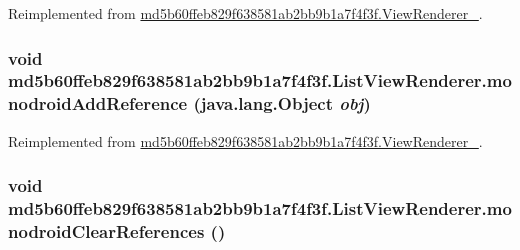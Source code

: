 Reimplemented from \hyperlink{classmd5b60ffeb829f638581ab2bb9b1a7f4f3f_1_1_view_renderer__2_a0898cf56fa9a49b653470eaf1608e77}{md5b60ffeb829f638581ab2bb9b1a7f4f3f.ViewRenderer\_}.\hypertarget{classmd5b60ffeb829f638581ab2bb9b1a7f4f3f_1_1_list_view_renderer_86959f77d1bb744ab196062ffa0c4a1a}{
\subsubsection[{monodroidAddReference}]{\setlength{\rightskip}{0pt plus 5cm}void md5b60ffeb829f638581ab2bb9b1a7f4f3f.ListViewRenderer.monodroidAddReference (java.lang.Object {\em obj})}}
\label{classmd5b60ffeb829f638581ab2bb9b1a7f4f3f_1_1_list_view_renderer_86959f77d1bb744ab196062ffa0c4a1a}




Reimplemented from \hyperlink{classmd5b60ffeb829f638581ab2bb9b1a7f4f3f_1_1_view_renderer__2_64ca8244a89f60a47c173d9c0b15d610}{md5b60ffeb829f638581ab2bb9b1a7f4f3f.ViewRenderer\_}.\hypertarget{classmd5b60ffeb829f638581ab2bb9b1a7f4f3f_1_1_list_view_renderer_a025a82d6f89159ae49a0b1b53722295}{
\subsubsection[{monodroidClearReferences}]{\setlength{\rightskip}{0pt plus 5cm}void md5b60ffeb829f638581ab2bb9b1a7f4f3f.ListViewRenderer.monodroidClearReferences ()}}
\label{classmd5b60ffeb829f638581ab2bb9b1a7f4f3f_1_1_list_view_renderer_a025a82d6f89159ae49a0b1b53722295}




